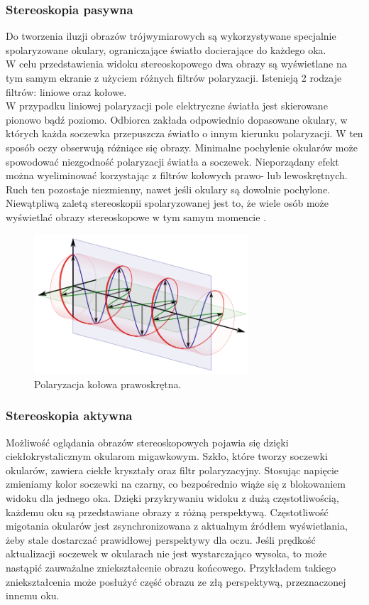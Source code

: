 \subsubsection{Stereoskopia pasywna} 
Do tworzenia iluzji obrazów trójwymiarowych są wykorzystywane specjalnie spolaryzowane okulary, ograniczające światło docierające do każdego oka. \\
W celu przedstawienia widoku stereoskopowego dwa obrazy są wyświetlane na tym samym ekranie z użyciem różnych filtrów polaryzacji. 
Istenieją 2 rodzaje filtrów: liniowe oraz kołowe.\\
W przypadku liniowej polaryzacji pole elektryczne światła jest skierowane pionowo bądź poziomo. Odbiorca zakłada odpowiednio dopasowane okulary, w których każda soczewka przepuszcza światło o innym kierunku polaryzacji. W ten sposób oczy obserwują różniące się obrazy. Minimalne pochylenie okularów może spowodować niezgodność polaryzacji światła a soczewek. Nieporządany efekt można wyeliminować korzystając z filtrów kołowych prawo- lub lewoskrętnych. Ruch ten pozostaje niezmienny, nawet jeśli okulary są dowolnie pochylone.\\
Niewątpliwą zaletą stereoskopii spolaryzowanej jest to, że wiele osób może wyświetlać obrazy stereoskopowe w tym samym momencie \cite{russianpage}.
\begin{figure}[H]
		\centering
 		\includegraphics[width=8cm]{circular.png}
    	\caption{Polaryzacja kołowa prawoskrętna.}
 		\label{rys1}
\end{figure}


\subsubsection{Stereoskopia aktywna} 
Możliwość oglądania obrazów stereoskopowych pojawia się dzięki ciekłokrystalicznym okularom migawkowym. Szkło, które tworzy soczewki okularów, zawiera ciekłe kryształy oraz filtr polaryzacyjny. Stosując napięcie zmieniamy kolor soczewki na czarny, co bezpośrednio wiąże się z blokowaniem widoku dla jednego oka. Dzięki przykrywaniu widoku z dużą częstotliwością, każdemu oku są przedstawiane obrazy z różną perspektywą. Częstotliwość migotania okularów jest zsynchronizowana z aktualnym źródłem wyświetlania, żeby stale dostarczać prawidłowej perspektywy dla oczu. Jeśli prędkość aktualizacji soczewek w okularach nie jest wystarczająco wysoka, to może nastąpić zauważalne zniekształcenie obrazu końcowego. Przykładem takiego zniekształcenia może posłużyć część obrazu ze złą perspektywą, przeznaczonej innemu oku. 

